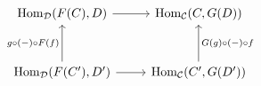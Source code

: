 \documentclass{standalone}
\newcommand{\Hom}{\textup{Hom}}
\begin{document}
$\displaystyle  \begin{tikzcd}[row sep=3em] \Hom_{\mathcal{D}}(F(C), D) \arrow{r} & \Hom_{\mathcal{C}}(C, G(D)) \\ \Hom_{\mathcal{D}}(F(C'), D') \arrow{r} \arrow{u}{g \circ (-) \circ F(f)} & \Hom_{\mathcal{C}}(C', G(D')) \arrow[swap]{u}{G(g) \circ (-) \circ f} \end{tikzcd} $
\end{document}
